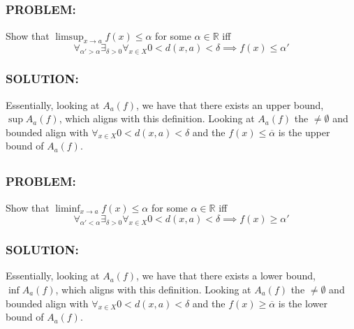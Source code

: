 \documentclass[]{article}
\newcommand{\Problem}{\subsubsection*{\textbf{PROBLEM:}}}
\newcommand{\Solution}{\subsubsection*{\textbf{SOLUTION:}}}
\newcommand{\R}{\mathbb{R}}
\begin{document}
\subsection{}
\Problem
Show that $\limsup_{x \to a} f(x) \leq \alpha$ for some $\alpha \in \R$ iff \[
    \forall_{\alpha' > \alpha} \exists_{\delta>0} \forall_{x \in X} 0 < d(x,a) < \delta \implies f(x) \leq \alpha'
\]
\Solution
Essentially, looking at $A_a(f)$, we have that there exists an upper bound, $\sup A_a(f)$, which aligns with this definition.
Looking at $A_a(f)$ the $\neq \emptyset$ and bounded align with $\forall_{x \in X} 0 < d(x,a) < \delta$ and the $f(x) \leq \overline{\alpha}$ is the upper bound of $A_a(f)$.


\subsection{}
\Problem
Show that $\liminf_{x \to a} f(x) \leq \alpha$ for some $\alpha \in \R$ iff \[
    \forall_{\alpha' < \alpha} \exists_{\delta>0} \forall_{x \in X}  0 < d(x,a) < \delta \implies f(x) \geq \alpha'
\]
\Solution
Essentially, looking at $A_a(f)$, we have that there exists a lower bound, $\inf A_a(f)$, which aligns with this definition.
Looking at $A_a(f)$ the $\neq \emptyset$ and bounded align with $\forall_{x \in X} 0 < d(x,a) < \delta$ and the $f(x) \geq \overline{\alpha}$ is the lower bound of $A_a(f)$.

\newpage
\end{document}
